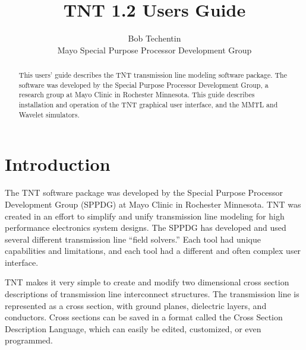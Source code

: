\documentclass{article}
\title {TNT 1.2 Users Guide}
\author {
Bob Techentin \\
Mayo Special Purpose Processor Development Group}
\begin{document}
\maketitle


\clearpage
{}
\tableofcontents
\clearpage
\listoffigures
\clearpage
{}

\begin{abstract}

This users' guide describes the TNT transmission line modeling
software package.  The software was developed by the Special Purpose
Processor Development Group, a research group at Mayo Clinic in
Rochester Minnesota.  This guide describes installation and operation
of the TNT graphical user interface, and the MMTL and Wavelet
simulators.


\end{abstract}

\clearpage
\setcounter{page}{2}



\section {Introduction}

The TNT software package was developed by the Special Purpose
Processor Development Group (SPPDG) at Mayo Clinic in Rochester
Minnesota.  TNT was created in an effort to simplify and unify
transmission line modeling for high performance electronics system
designs.  The SPPDG has developed and used several different
transmission line ``field solvers.''  Each tool had unique
capabilities and limitations, and each tool had a different and often
complex user interface.

TNT makes it very simple to create and modify two dimensional cross
section descriptions of transmission line interconnect structures.
The transmission line is represented as a cross section, with ground
planes, dielectric layers, and conductors.  Cross sections can be
saved in a format called the Cross Section Description Language, which
can easily be edited, customized, or even programmed.
\end{document}
